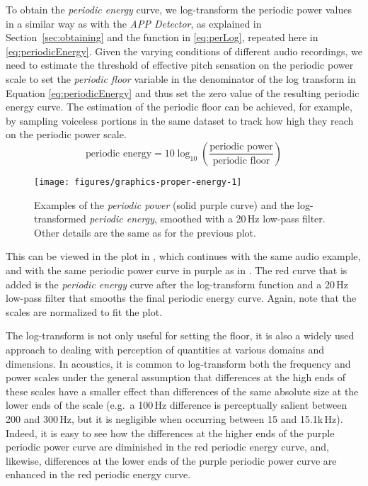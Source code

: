 To obtain the \emph{periodic energy} curve, we log-transform the periodic power values in a similar way as with the \emph{APP Detector}, as explained in Section~\ref{sec:obtaining} and the function in \eqref{eq:perLog}, repeated here in \eqref{eq:periodicEnergy}. Given the varying conditions of different audio recordings, we need to estimate the threshold of effective pitch sensation on the periodic power scale to set the \emph{periodic floor} variable in the denominator of the log transform in Equation \eqref{eq:periodicEnergy} and thus set the zero value of the resulting periodic energy curve. The estimation of the periodic floor can be achieved, for example, by sampling voiceless portions in the same dataset to track how high they reach on the periodic power scale.
\begin{equation}
  \text{periodic energy} = 10 \log_{10}\!\left(\frac{\text{periodic power}}{\text{periodic floor}}\right)  \label{eq:periodicEnergy}
\end{equation}

\begin{figure}
\texttt{[image: figures/graphics-proper-energy-1]}
\caption{Examples of the \emph{periodic power} (solid purple curve) and the log-transformed \emph{periodic energy}, smoothed with a 20\,Hz low-pass filter. Other details are the same as for the previous plot.}\label{fig:proper-energy}
\end{figure}

This can be viewed in the plot in , which continues with the same audio example, and with the same periodic power curve in purple as in . The red curve that is added is the \emph{periodic energy} curve after the log-transform function and a 20\,Hz low-pass filter that smooths the final periodic energy curve.
Again, note that the scales are normalized to fit the plot.

The log-transform is not only useful for setting the floor, it is also a widely used approach to dealing with perception of quantities at various domains and dimensions. In acoustics, it is common to log-transform both the frequency and power scales under the general assumption that differences at the high ends of these scales have a smaller effect than differences of the same absolute size at the lower ends of the scale (e.g.~a 100\,Hz difference is perceptually salient between 200 and 300\,Hz, but it is negligible when occurring between 15 and 15.1k\,Hz). Indeed, it is easy to see how the differences at the higher ends of the purple periodic power curve are diminished in the red periodic energy curve, and, likewise, differences at the lower ends of the purple periodic power curve are enhanced in the red periodic energy curve.


